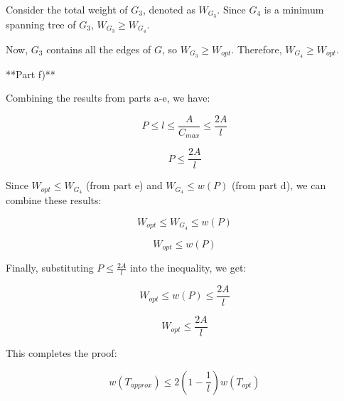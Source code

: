 Consider the total weight of \(G_3\), denoted as \(W_{G_3}\). Since \(G_4\) is a minimum spanning tree of \(G_3\), \(W_{G_3} \geq W_{G_4}\).

Now, \(G_3\) contains all the edges of \(G\), so \(W_{G_3} \geq W_{opt}\). Therefore, \(W_{G_4} \geq W_{opt}\).

**Part f)**

Combining the results from parts a-e, we have:

\[P \leq l \leq \frac{A}{C_{max}} \leq \frac{2A}{l}\]

\[P \leq \frac{2A}{l}\]

Since \(W_{opt} \leq W_{G_4}\) (from part e) and \(W_{G_4} \leq w(P)\) (from part d), we can combine these results:

\[W_{opt} \leq W_{G_4} \leq w(P)\]

\[W_{opt} \leq w(P)\]

Finally, substituting \(P \leq \frac{2A}{l}\) into the inequality, we get:

\[W_{opt} \leq w(P) \leq \frac{2A}{l}\]

\[W_{opt} \leq \frac{2A}{l}\]

This completes the proof:

\[w(T_{approx}) \leq 2(1 − \frac{1}{l}) w(T_{opt})\]